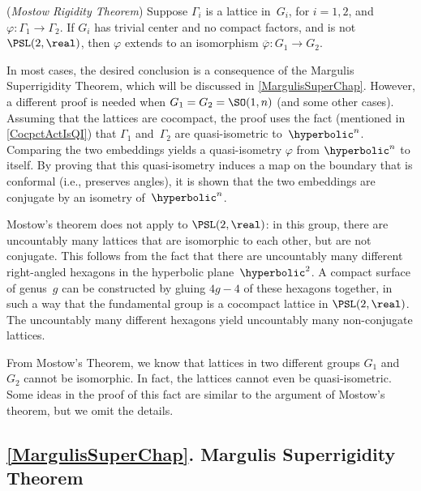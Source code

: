 \smallskip

 (\emph{Mostow Rigidity Theorem}) 
Suppose $\Gamma_i$ is a lattice in~$G_i$, for $i = 1,2$, and $\varphi \colon \Gamma_1 \to \Gamma_2$. If $G_i$ has trivial center and no compact factors, and is not $\PSL(2,\real)$, then $\varphi$ extends to an isomorphism $\overline\varphi \colon G_1 \to G_2$. 

In most cases, the desired conclusion is a consequence of the Margulis Superrigidity Theorem, which will be discussed in \cref{MargulisSuperChap}. 
However, a different proof is needed when $G_1 = G_2 = \SO(1,n)$ (and some other cases). Assuming that the lattices are cocompact, the proof uses the fact (mentioned in \cref{CocpctActIsQI}) that $\Gamma_1$ and~$\Gamma_2$ are quasi-isometric to~$\hyperbolic^n$. Comparing the two embeddings yields a quasi-isometry $\varphi$ from $\hyperbolic^n$ to itself. By proving that this quasi-isometry induces a map on the boundary that is conformal (i.e., preserves angles), it is shown that the two embeddings are conjugate by an isometry of~$\hyperbolic^n$.

\smallbreak

 Mostow's theorem does not apply to $\PSL(2,\real)$: in this group, there are uncountably many lattices that are isomorphic to each other, but are not conjugate. This follows from the fact that there are uncountably many different right-angled hexagons in the hyperbolic plane~$\hyperbolic^2$. A compact surface of genus~$g$ can be constructed by gluing $4g-4$ of these hexagons together, in such a way that the fundamental group is a cocompact lattice in $\PSL(2,\real)$. The uncountably many different hexagons yield uncountably many non-conjugate lattices.

\smallbreak

 From Mostow's Theorem, we know that lattices in two different groups $G_1$ and~$G_2$ cannot be isomorphic. In fact, the lattices cannot even be quasi-isometric.
Some ideas in the proof of this fact are similar to the argument of Mostow's theorem, but we omit the details.





\subsection*{\cref{MargulisSuperChap}. Margulis Superrigidity Theorem} \ 

\smallskip

